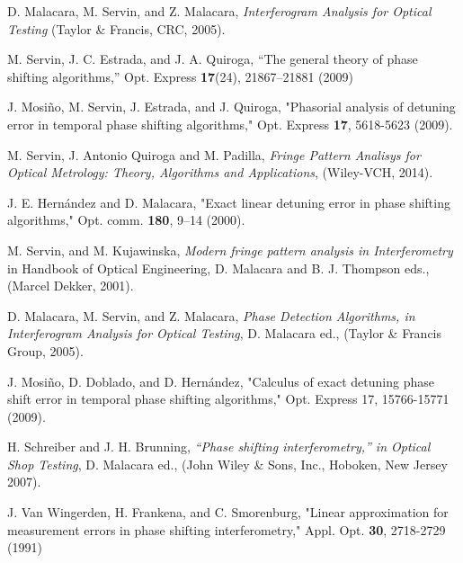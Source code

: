 \begin{thebibliography}{99}

 D. Malacara, M. Servin, and Z. Malacara,
\textit{Interferogram Analysis for Optical Testing} (Taylor \& Francis, CRC,
2005).
 
 M. Servin, J. C. Estrada, and J. A. Quiroga, “The 
  general theory of phase shifting algorithms,” Opt. Express \textbf{17}(24), 
  21867–21881 (2009) %
  
   J. Mosi\~{n}o, M. Servin, J. Estrada, and
  J. Quiroga, "Phasorial analysis of detuning error in temporal phase
  shifting algorithms," Opt. Express \textbf{17}, 5618-5623 (2009). 
  
   M. Servin, J. Antonio Quiroga and M. Padilla, 
  \textit{Fringe Pattern Analisys for Optical Metrology: Theory, Algorithms 
  and Applications}, (Wiley-VCH, 2014).
  
   J. E. Hernández and D. Malacara, "Exact linear 
  detuning error in phase shifting algorithms," Opt. comm. \textbf{180}, 9–14 
  (2000). 
  
   M. Servin, and M. Kujawinska, \textit{Modern 
  fringe pattern analysis in Interferometry} in Handbook of Optical 
  Engineering, D. Malacara and B. J. Thompson eds., (Marcel Dekker, 2001).
  
   D. Malacara, M. Servin, and Z. Malacara, \textit{ 
  Phase Detection Algorithms, in Interferogram Analysis for Optical Testing}, 
  D. Malacara ed., (Taylor \& Francis Group, 2005).
  
   J. Mosi\~no, D. Doblado, and D. Hern\'andez,
"Calculus 
  of exact detuning phase shift error in temporal phase shifting algorithms," 
  Opt. Express  17, 15766-15771 (2009).
  
   H. Schreiber and J. H. Brunning, \textit{“Phase 
  shifting interferometry,” in Optical Shop Testing}, D. Malacara ed., (John 
  Wiley \& Sons, Inc., Hoboken, New Jersey 2007).
  
   J. Van Wingerden, H. Frankena, and C. Smorenburg, 
  "Linear approximation for measurement errors in phase shifting 
  interferometry," Appl. Opt. \textbf{30}, 2718-2729 (1991) 
  

\end{thebibliography}
